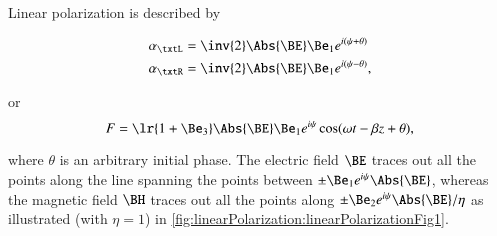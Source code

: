 %
%

Linear polarization is described by

\begin{dmath}\label{eqn:polarization_linearPolarization:280}
\begin{aligned}
\alpha_\txtL &= \inv{2}\Abs{\BE} \Be_1 e^{i(\psi + \theta)} \\
\alpha_\txtR &= \inv{2}\Abs{\BE} \Be_1 e^{i(\psi - \theta)},
\end{aligned}
\end{dmath}

or
\begin{dmath}\label{eqn:polarization_linearPolarization:300}
F = \lr{ 1 + \Be_3 } \Abs{\BE} \Be_1 e^{i\psi} \cos( \omega t - \beta z + \theta ),
\end{dmath}

where \( \theta \) is an arbitrary initial phase.  The electric field \( \BE \) traces out all the points along the line spanning the points between \( \pm \Be_1 e^{i\psi} \Abs{\BE} \), whereas the magnetic field \( \BH \) traces
out all the points along \( \pm \Be_2 e^{i\psi} \Abs{\BE}/\eta \) as illustrated (with \( \eta = 1 \)) in
\cref{fig:linearPolarization:linearPolarizationFig1}.

